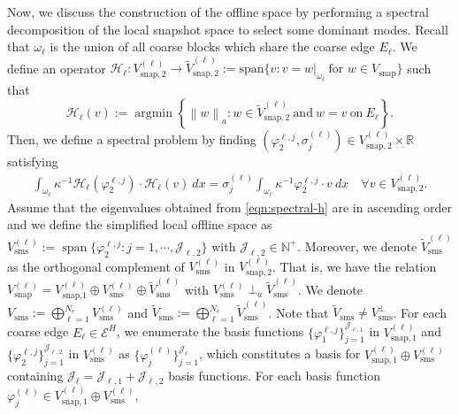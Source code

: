 \documentclass{article}[11pt]
\theoremstyle{definition}
\newcommand{\norm}[1]{\left\|#1\right\|}
\DeclareMathOperator{\argmin}{argmin}
\DeclareMathOperator{\spa}{span}
\begin{document}
Now, we discuss the construction of the offline space by performing a spectral decomposition of the local snapshot space to select some dominant modes. Recall that $\omega_{\ell}$ is the union of all coarse blocks which share the coarse edge $E_{\ell}$. We define an operator $\mathcal{H}_{\ell}: V_{\text{snap},2}^{(\ell)} \to \tilde V_{\text{snap},2}^{(\ell)} := \text{span} \{ v : v = \left . w \right |_{\omega_\ell} ~ \text{for } w \in V_{\text{snap}}\}$ such that 
$$ \mathcal{H}_\ell (v) := \argmin \left \{ \norm{w}_a : w \in \tilde V_{\text{snap},2}^{(\ell)} ~ \text{and} ~ w = v ~ \text{on} ~ E_\ell \right \}.$$
Then, we define a spectral problem by finding $(\varphi_{2}^{\ell,j}, \sigma_j^{(\ell)}) \in V_{\text{snap},2}^{(\ell)} \times \mathbb{R}$ satisfying 
\begin{eqnarray}
\int_{\omega_\ell} \kappa^{-1}  \mathcal{H}_\ell (\varphi_{2}^{\ell,j}) \cdot \mathcal{H}_\ell (v) ~ dx = \sigma_j^{(\ell)} \int_{\omega_\ell} \kappa^{-1} \varphi_{2}^{\ell,j} \cdot v~ dx \quad \forall v \in V_{\text{snap},2}^{(\ell)}.
\label{eqn:spectral-h}
\end{eqnarray}
Assume that the eigenvalues obtained from \eqref{eqn:spectral-h} are in ascending order and we define the simplified local offline space as $V_{\text{sms}}^{(\ell)} := \spa \{ \varphi_{2}^{\ell,j} : j = 1,\cdots, \mathcal{J}_{\ell,2} \}$ with $\mathcal{J}_{\ell,2} \in \mathbb{N}^+$. Moreover, we denote $\tilde V_{\text{sms}}^{(\ell)}$ as the orthogonal complement of $V_{\text{sms}}^{(\ell)}$ in $V_{\text{snap},2}^{(\ell)}$. That is, we have the relation $V_{\text{snap}}^{(\ell)} = V_{\text{snap,1}}^{(\ell)} \oplus V_{\text{sms}}^{(\ell)} \oplus \tilde V_{\text{sms}}^{(\ell)}$ with $V_{\text{sms}}^{(\ell)}\perp_{a}\tilde{V}_{\text{sms}}^{(\ell)}$. We denote $V_{\text{sms}} := \bigoplus_{\ell = 1}^{N_e} V_{\text{sms}}^{(\ell)}$ and $\tilde V_{\text{sms}} := \bigoplus_{\ell = 1}^{N_e} \tilde V_{\text{sms}}^{(\ell)}$. Note that $\tilde V_{\text{sms}} \neq V_{\text{sms}}^{\perp}$. 
For each coarse edge $E_\ell \in \mathcal{E}^H$, we enumerate the basis functions 
$\{\varphi_{1}^{\ell,j}\}_{j=1}^{\mathcal{J}_{\ell,1}}$ in $V_{\text{snap},1}^{(\ell)}$ and 
$\{\varphi_{2}^{\ell,j}\}_{j=1}^{\mathcal{J}_{\ell,2}}$ in $V_{\text{sms}}^{(\ell)}$ 
as $\{\varphi_j^{(\ell)}\}_{j=1}^{\mathcal{J}_{\ell}}$,  
which constitutes a basis for $V_{\text{snap},1}^{(\ell)} \oplus V_{\text{sms}}^{(\ell)}$ 
containing $\mathcal{J}_{\ell} = \mathcal{J}_{\ell,1} + \mathcal{J}_{\ell,2}$ basis functions. 
For each basis function $\varphi_j^{(\ell)} \in V^{(\ell)}_{\text{snap},1} \oplus V^{(\ell)}_{\text{sms}}$, 
\end{document}
